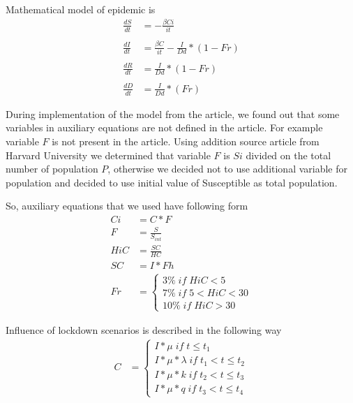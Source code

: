 \documentclass[12pt,a4paper,english]{article}
\begin{document}
    Mathematical model of epidemic is
    \begin{subequations} \label{eq:quations}
        \begin{align*} 
            \frac{dS}{dt} &= - \frac{\beta Ci}{it}  \\ \\
            \frac{dI}{dt} &= \frac{\beta C}{it} - \frac{I}{Dd} * (1 - Fr)\\ \\
            \frac{dR}{dt} &= \frac{I}{Dd} * (1 - Fr)\\ \\
            \frac{dD}{dt} &= \frac{I}{Dd} * (Fr)
        \end{align*}
    \end{subequations}


    During implementation of the model from the article, we found out that some variables in auxiliary equations are not defined in the article. 
    For example variable $F$ is not present in the article. 
    Using addition source article from Harvard University \cite{Harvard} we determined that variable $F$ is $Si$ divided on the total number of population $P$, otherwise we decided not to use additional variable for population and decided to use
    initial value of Susceptible as total population. 
    
    So, auxiliary equations that we used have following form
    \begin{subequations}
        \begin{align*} 
            Ci  &= C *F \\
            F   &= \frac{S}{S_{int}} \\ 
            HiC &= \frac{SC}{HC} \\
            SC  &= I * Fh \\
            Fr  &=    
            \begin{cases}
                3\% \; if \; HiC < 5 \\
                7\% \; if \; 5 < HiC < 30 \\
                10\% \; if \; HiC > 30
            \end{cases}
        \end{align*}
    \end{subequations}

    Influence of lockdown scenarios is described in the following way
    \begin{subequations}
        \begin{align*} 
            C  &=    
            \begin{cases}
                I * \mu \; if \; t \leq  t_1 \\
                I * \mu * \lambda \; if \; t_1 < t \leq t_2 \\
                I * \mu * k \; if \; t_2 < t \leq t_3 \\
                I * \mu * q \; if \; t_3 < t \leq t_4
            \end{cases}
        \end{align*}
    \end{subequations}
\end{document}
